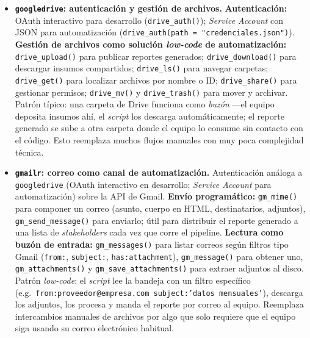 \documentclass[11pt,letterpaper]{article}
\newcommand{\blue}[1]{{\color{cerulean}#1}}
\begin{document}
\begin{itemize}[leftmargin=*, itemsep=2pt]
    \item \textbf{\texttt{googledrive}: autenticación y gestión de archivos.} \textbf{Autenticación:} OAuth interactivo para desarrollo (\texttt{drive\_auth()}); \textit{Service Account} con JSON para automatización (\texttt{drive\_auth(path = "credenciales.json")}). \textbf{Gestión de archivos como solución \textit{low-code} de automatización:} \texttt{drive\_upload()} para publicar reportes generados; \texttt{drive\_download()} para descargar insumos compartidos; \texttt{drive\_ls()} para navegar carpetas; \texttt{drive\_get()} para localizar archivos por nombre o ID; \texttt{drive\_share()} para gestionar permisos; \texttt{drive\_mv()} y \texttt{drive\_trash()} para mover y archivar. \blue{Patrón típico}: una carpeta de Drive funciona como \textit{buzón} ---el equipo deposita insumos ahí, el \textit{script} los descarga automáticamente; el reporte generado se sube a otra carpeta donde el equipo lo consume sin contacto con el código. Esto reemplaza muchos flujos manuales con muy poca complejidad técnica.
    \item \textbf{\texttt{gmailr}: correo como canal de automatización.} Autenticación análoga a \texttt{googledrive} (OAuth interactivo en desarrollo; \textit{Service Account} para automatización) sobre la API de Gmail. \textbf{Envío programático:} \texttt{gm\_mime()} para componer un correo (asunto, cuerpo en HTML, destinatarios, adjuntos), \texttt{gm\_send\_message()} para enviarlo; útil para distribuir el reporte generado a una lista de \textit{stakeholders} cada vez que corre el pipeline. \textbf{Lectura como buzón de entrada:} \texttt{gm\_messages()} para listar correos según filtros tipo Gmail (\texttt{from:}, \texttt{subject:}, \texttt{has:attachment}), \texttt{gm\_message()} para obtener uno, \texttt{gm\_attachments()} y \texttt{gm\_save\_attachments()} para extraer adjuntos al disco. \blue{Patrón \textit{low-code}}: el \textit{script} lee la bandeja con un filtro específico (e.g.\ \texttt{from:proveedor@empresa.com subject:'datos mensuales'}), descarga los adjuntos, los procesa y manda el reporte por correo al equipo. Reemplaza intercambios manuales de archivos por algo que solo requiere que el equipo siga usando su correo electrónico habitual.
\end{itemize}
\end{document}

